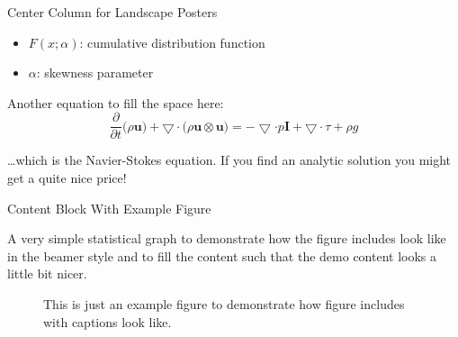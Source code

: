 \documentclass[final]{beamer}
\begin{document}
\begin{frame}[fragile]
\begin{columns}[t]
\begin{centercolumn}
\begin{boxblock}{Center Column for Landscape Posters}
         \begin{footnotesize}
         \begin{itemize}
            \item $F(x;\alpha)$: cumulative distribution function
            \item $\alpha$: skewness parameter
         \end{itemize}
         \end{footnotesize}

         \vspace{1em}
         Another equation to fill the space here:
         \begin{equation}
            \frac{\partial}{\partial t}\big(\rho \mathbf{u}\big) + \bigtriangledown \cdot
            \big(\rho \mathbf{u} \otimes \mathbf{u}\big) =
            - \bigtriangledown \cdot p \mathbf{I} + \bigtriangledown \cdot \tau + \rho g
         \end{equation}

         \dots which is the Navier-Stokes equation. If you find an analytic
         solution you might get a quite nice price!
      \end{boxblock}

      \begin{boxblock}{Content Block With Example Figure}

         A very simple statistical graph to demonstrate how the figure
         includes look like in the beamer style and to fill the content
         such that the demo content looks a little bit nicer.

         \begin{figure}
            \centering
            \caption{This is just an example figure to demonstrate how
               figure includes with captions look like.}
         \end{figure}


\end{boxblock}
\end{centercolumn}
\end{columns}
\end{frame}
\end{document}
